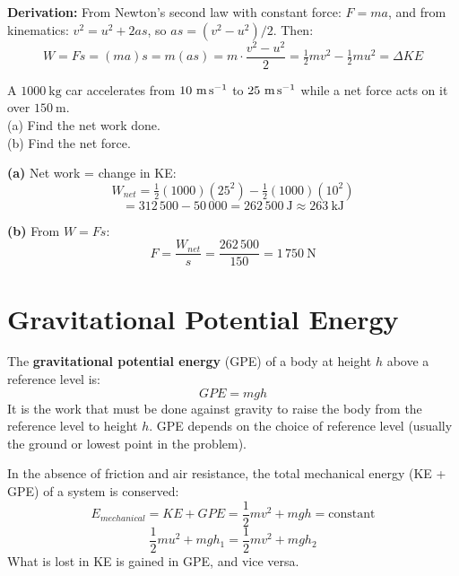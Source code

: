 \textbf{Derivation:}
From Newton's second law with constant force:
$F = ma$, and from kinematics: $v^2 = u^2 + 2as$,
so $as = (v^2-u^2)/2$. Then:
\[
  W = Fs = (ma)s = m(as) = m\cdot\frac{v^2-u^2}{2}
  = \tfrac{1}{2}mv^2 - \tfrac{1}{2}mu^2 = \Delta KE
\]

\begin{examplebox}[5.2]
A $1000\ \text{kg}$ car accelerates from
$10\ \text{m\,s}^{-1}$ to $25\ \text{m\,s}^{-1}$
while a net force acts on it over $150\ \text{m}$.\\
(a) Find the net work done.\\
(b) Find the net force.
\end{examplebox}

\begin{solutionbox}
\textbf{(a)} Net work = change in KE:
\[
  W_{net} = \tfrac{1}{2}(1000)(25^2)
  - \tfrac{1}{2}(1000)(10^2)
\]
\[
  = 312\,500 - 50\,000 = 262\,500\ \text{J}
  \approx 263\ \text{kJ}
\]

\textbf{(b)} From $W = Fs$:
\[
  F = \frac{W_{net}}{s}
  = \frac{262\,500}{150} = 1\,750\ \text{N}
\]
\end{solutionbox}

\section{Gravitational Potential Energy}

\begin{definitionbox}
The \textbf{gravitational potential energy} (GPE) of
a body at height $h$ above a reference level is:
\[
  GPE = mgh
\]
It is the work that must be done against gravity to
raise the body from the reference level to height $h$.
GPE depends on the choice of reference level (usually
the ground or lowest point in the problem).
\end{definitionbox}

\begin{lawbox}
In the absence of friction and air resistance, the
total mechanical energy (KE + GPE) of a system is
conserved:
\[
  E_{mechanical} = KE + GPE
  = \frac{1}{2}mv^2 + mgh = \text{constant}
\]
\[
  \frac{1}{2}mu^2 + mgh_1
  = \frac{1}{2}mv^2 + mgh_2
\]
What is lost in KE is gained in GPE, and vice versa.
\end{lawbox}

